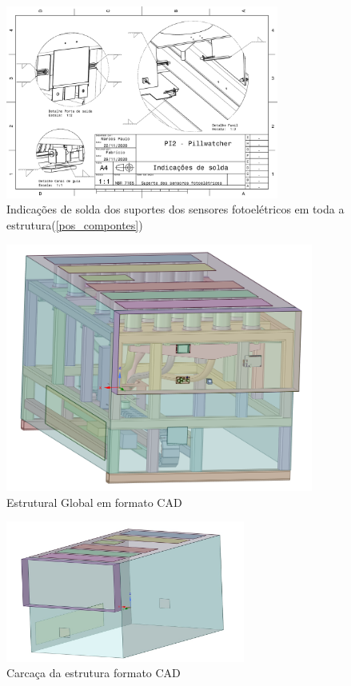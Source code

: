 \begin{apendicesenv}
\begin{figure}[H]
    \centering
    \includegraphics[width=0.8\textwidth]{figuras/estrutura/Desenhos/Solda_fotossensores.pdf}
    \caption{Indicações de solda dos suportes dos sensores fotoelétricos em toda a estrutura(\ref{pos_compontes})}
    \label{fig:Solda_Supp_fotossensores}
\end{figure}

\begin{figure}[H]
    \centering
    \includegraphics[width=0.9\textwidth]{figuras/estrutura/Design/Vista completa com circuitaria.png}
    \caption{Estrutural Global em formato CAD}
    \label{fig:global}
\end{figure}

\begin{figure}[H]
    \centering
    \includegraphics[width=0.7\textwidth]{figuras/estrutura/Design/ChapasExterior.jpeg}
    \caption{Carcaça da estrutura formato CAD}
    \label{fig:Carcaca}
\end{figure}


\end{apendicesenv}
